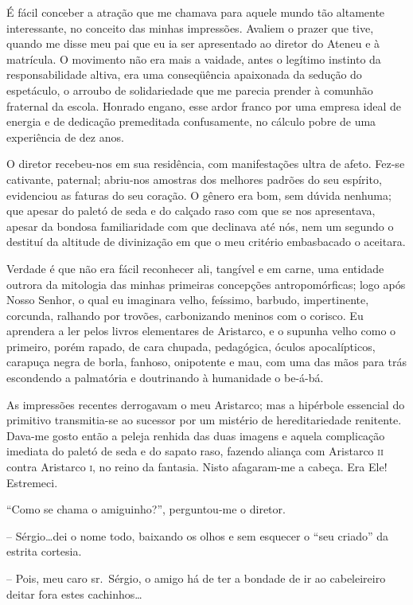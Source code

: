 É fácil conceber a atração que me chamava para aquele mundo
tão altamente interessante, no conceito das minhas impressões. Avaliem
o prazer que tive, quando me disse meu pai que eu ia ser apresentado ao
diretor do Ateneu e à matrícula. O movimento não era mais a vaidade,
antes o legítimo instinto da responsabilidade altiva, era uma
conseqüência apaixonada da sedução do espetáculo, o arroubo de
solidariedade que me parecia prender à comunhão fraternal da escola.
Honrado engano, esse ardor franco por uma empresa ideal de energia e de
dedicação premeditada confusamente, no cálculo pobre de uma experiência
de dez anos. 

O diretor recebeu{}-nos em sua residência, com
manifestações ultra de afeto. Fez{}-se cativante, paternal; abriu{}-nos
amostras dos melhores padrões do seu espírito, evidenciou as faturas do
seu coração. O gênero era bom, sem dúvida nenhuma; que apesar do paletó
de seda e do calçado raso com que se nos apresentava, apesar da bondosa
familiaridade com que declinava até nós, nem um segundo o destituí da
altitude de divinização em que o meu critério embasbacado o aceitara.

Verdade é que não era fácil reconhecer ali, tangível e em carne, uma
entidade outrora da mitologia das minhas primeiras concepções
antropomórficas; logo após Nosso Senhor, o qual eu imaginara velho,
feíssimo, barbudo, impertinente, corcunda, ralhando por trovões,
carbonizando meninos com o corisco. Eu aprendera a ler pelos livros
elementares de Aristarco, e o supunha velho como o primeiro, porém
rapado, de cara chupada, pedagógica, óculos apocalípticos, carapuça
negra de borla, fanhoso, onipotente e mau, com uma das mãos para trás
escondendo a palmatória e doutrinando à humanidade o be{}-á{}-bá. 

As impressões recentes derrogavam o meu Aristarco; mas a hipérbole
essencial do primitivo transmitia{}-se ao sucessor por um mistério de
hereditariedade renitente. Dava{}-me gosto então a peleja renhida das
duas imagens e aquela complicação imediata do paletó de seda e do
sapato raso, fazendo aliança com Aristarco \textsc{ii} contra Aristarco \textsc{i}, no
reino da fantasia. Nisto afagaram{}-me a cabeça. Era Ele! Estremeci.

``Como se chama o amiguinho?'', perguntou{}-me o diretor. 

-- Sérgio\ldots dei o nome todo, baixando os olhos e sem esquecer o ``seu criado'' da
estrita cortesia. 

-- Pois, meu caro sr.~Sérgio, o amigo há de ter a
bondade de ir ao cabeleireiro deitar fora estes cachinhos\ldots 

